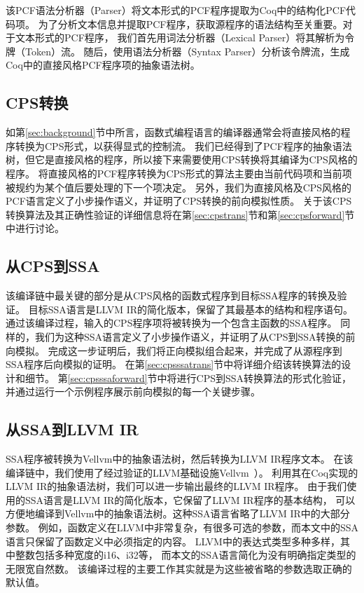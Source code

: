 该PCF语法分析器（Parser）将文本形式的PCF程序提取为Coq中的结构化PCF代码项。
为了分析文本信息并提取PCF程序，获取源程序的语法结构至关重要。对于文本形式的PCF程序，
我们首先用词法分析器（Lexical Parser）将其解析为令牌（Token）流。
随后，使用语法分析器（Syntax Parser）分析该令牌流，生成Coq中的直接风格PCF程序项的抽象语法树。

\subsection{CPS转换}

如第\ref{sec:background}节中所言，函数式编程语言的编译器通常会将直接风格的程序转换为CPS形式，以获得显式的控制流。
我们已经得到了PCF程序的抽象语法树，但它是直接风格的程序，所以接下来需要使用CPS转换将其编译为CPS风格的程序。
将直接风格的PCF程序转换为CPS形式的算法主要由当前代码项和当前项被规约为某个值后要处理的下一个项决定。
另外，我们为直接风格及CPS风格的PCF语言定义了小步操作语义，并证明了CPS转换的前向模拟性质。
关于该CPS转换算法及其正确性验证的详细信息将在第\ref{sec:cpstrans}节和第\ref{sec:cpsforward}节中进行讨论。

\subsection{从CPS到SSA}

该编译链中最关键的部分是从CPS风格的函数式程序到目标SSA程序的转换及验证。
目标SSA语言是LLVM IR的简化版本，保留了其最基本的结构和程序语句。
通过该编译过程，输入的CPS程序项将被转换为一个包含主函数的SSA程序。
同样的，我们为这种SSA语言定义了小步操作语义，并证明了从CPS到SSA转换的前向模拟。
完成这一步证明后，我们将正向模拟组合起来，并完成了从源程序到SSA程序后向模拟的证明。
在第\ref{sec:cpsssatrans}节中将详细介绍该转换算法的设计和细节。
第\ref{sec:cpsssaforward}节中将进行CPS到SSA转换算法的形式化验证，并通过运行一个示例程序展示前向模拟的每一个关键步骤。

\subsection{从SSA到LLVM IR}

SSA程序被转换为Vellvm中的抽象语法树，然后转换为LLVM IR程序文本。
在该编译链中，我们使用了经过验证的LLVM基础设施Vellvm~\cite{zakowski2021modular}）。
利用其在Coq实现的LLVM IR的抽象语法树，我们可以进一步输出最终的LLVM IR程序。
由于我们使用的SSA语言是LLVM IR的简化版本，它保留了LLVM IR程序的基本结构，
可以方便地编译到Vellvm中的抽象语法树。这种SSA语言省略了LLVM IR中的大部分参数。
例如，函数定义在LLVM中非常复杂，有很多可选的参数，而本文中的SSA语言只保留了函数定义中必须指定的内容。
LLVM中的表达式类型多种多样，其中整数包括多种宽度的i16、i32等，
而本文的SSA语言简化为没有明确指定类型的无限宽自然数。
该编译过程的主要工作其实就是为这些被省略的参数选取正确的默认值。
